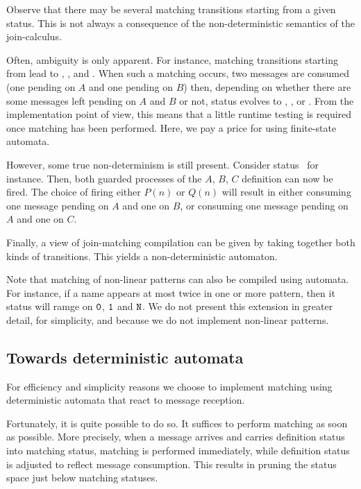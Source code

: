 Observe that there may be several matching transitions starting from a
given status.  This is not always a consequence of the
non-deterministic semantics of the join-calculus.

Often, ambiguity is only apparent.  For instance, matching transitions
starting from  lead to , ,
 and .  When such a matching occurs, two
messages are consumed (one pending on $A$ and one pending on $B$)
then, depending on whether there are some messages left pending on $A$
and $B$ or not, status evolves to , ,
 or .  From the implementation point of view,
this means that a little runtime testing is required once matching has
been performed. Here, we pay a price for using finite-state automata.

However, some true non-determinism is still present.  Consider
status~ for instance.  Then, both guarded processes of the
$A$, $B$, $C$ definition can now be fired.  The choice of firing
either $P(n)$ or $Q(n)$ will result in either consuming one message
pending on $A$ and one on $B$, or consuming one message pending on $A$
and one on $C$.

Finally, a view of join-matching compilation can be given by taking
together both kinds of transitions. This yields a non-deterministic
automaton.

Note that matching of non-linear patterns  can also be compiled using automata.
For instance, if a name appears at most twice in one or more pattern,
then it status will ramge on ${\tt 0}$, ${\tt 1}$ and ${\tt N}$.
We do not present this extension in greater detail, for simplicity, and
because we do not implement non-linear patterns.

\subsection{Towards deterministic automata}

For efficiency and simplicity reasons we choose to implement matching
using deterministic automata that react to message reception.

Fortunately, it is quite possible to do so. It suffices to perform
matching as soon as possible.  More precisely, when a message arrives
and carries definition status into matching status, matching is
performed immediately, while definition status is adjusted to reflect
message consumption.  This results in pruning the status space just
below matching statuses.


